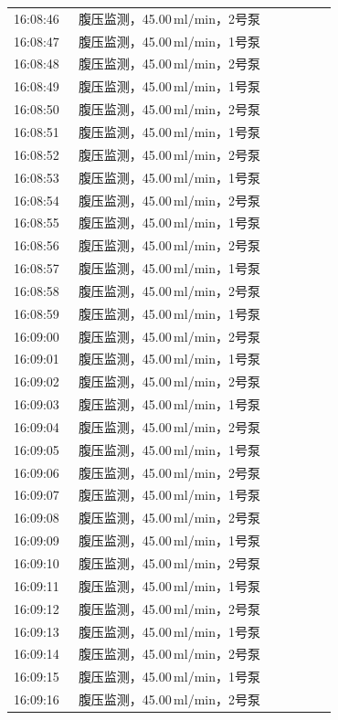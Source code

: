 \documentclass[UTF8,10pt,a4paper,fontset=fandol]{ctexart}
\begin{document}
\begin{center}
\begin{tabular}{p{0.18\linewidth}p{0.72\linewidth}}
16:08:46 & 腹压监测，45.00\,ml/min，2号泵\\
16:08:47 & 腹压监测，45.00\,ml/min，1号泵\\
16:08:48 & 腹压监测，45.00\,ml/min，2号泵\\
16:08:49 & 腹压监测，45.00\,ml/min，1号泵\\
16:08:50 & 腹压监测，45.00\,ml/min，2号泵\\
16:08:51 & 腹压监测，45.00\,ml/min，1号泵\\
16:08:52 & 腹压监测，45.00\,ml/min，2号泵\\
16:08:53 & 腹压监测，45.00\,ml/min，1号泵\\
16:08:54 & 腹压监测，45.00\,ml/min，2号泵\\
16:08:55 & 腹压监测，45.00\,ml/min，1号泵\\
16:08:56 & 腹压监测，45.00\,ml/min，2号泵\\
16:08:57 & 腹压监测，45.00\,ml/min，1号泵\\
16:08:58 & 腹压监测，45.00\,ml/min，2号泵\\
16:08:59 & 腹压监测，45.00\,ml/min，1号泵\\
16:09:00 & 腹压监测，45.00\,ml/min，2号泵\\
16:09:01 & 腹压监测，45.00\,ml/min，1号泵\\
16:09:02 & 腹压监测，45.00\,ml/min，2号泵\\
16:09:03 & 腹压监测，45.00\,ml/min，1号泵\\
16:09:04 & 腹压监测，45.00\,ml/min，2号泵\\
16:09:05 & 腹压监测，45.00\,ml/min，1号泵\\
16:09:06 & 腹压监测，45.00\,ml/min，2号泵\\
16:09:07 & 腹压监测，45.00\,ml/min，1号泵\\
16:09:08 & 腹压监测，45.00\,ml/min，2号泵\\
16:09:09 & 腹压监测，45.00\,ml/min，1号泵\\
16:09:10 & 腹压监测，45.00\,ml/min，2号泵\\
16:09:11 & 腹压监测，45.00\,ml/min，1号泵\\
16:09:12 & 腹压监测，45.00\,ml/min，2号泵\\
16:09:13 & 腹压监测，45.00\,ml/min，1号泵\\
16:09:14 & 腹压监测，45.00\,ml/min，2号泵\\
16:09:15 & 腹压监测，45.00\,ml/min，1号泵\\
16:09:16 & 腹压监测，45.00\,ml/min，2号泵\\

\end{tabular}
\end{center}
\end{document}
